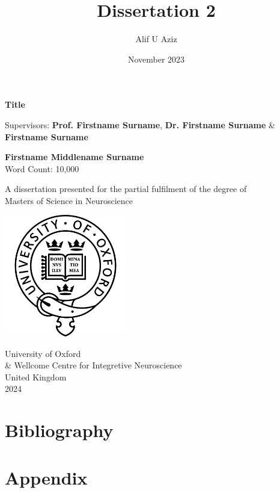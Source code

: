 \documentclass{article}
\title{Dissertation 2}
\author{Alif U Aziz}
\date{November 2023}
\begin{document}
\begin{titlepage}
   \begin{center}
       \vspace*{0.5cm}
    \large
       \textbf{Title}

       \vspace{0.5cm}
        Supervisors: \textbf{Prof. Firstname Surname}, \textbf{Dr. Firstname Surname} \& \textbf{Firstname Surname}            
       \vspace{1.5cm}

       \textbf{Firstname Middlename Surname} \\
       Word Count: 10,000
       \vfill
            
       A dissertation presented for the partial fulfilment of the degree of\\
       Masters of Science in Neuroscience
            
       \vspace{0.8cm}
     
       \includegraphics[width=0.4\textwidth]{images/university-of-oxford-badge-logo.png}
    
        \vspace{1 cm}
       University of Oxford \\ \& Wellcome Centre for Integretive Neuroscience\\
       United Kingdom\\
       2024
            
   \end{center}
\end{titlepage}



\pagebreak



\pagebreak
\tableofcontents

\pagebreak



\pagebreak



\pagebreak



\pagebreak


\pagebreak
\section*{Bibliography}





\section*{Appendix}

\end{document}
